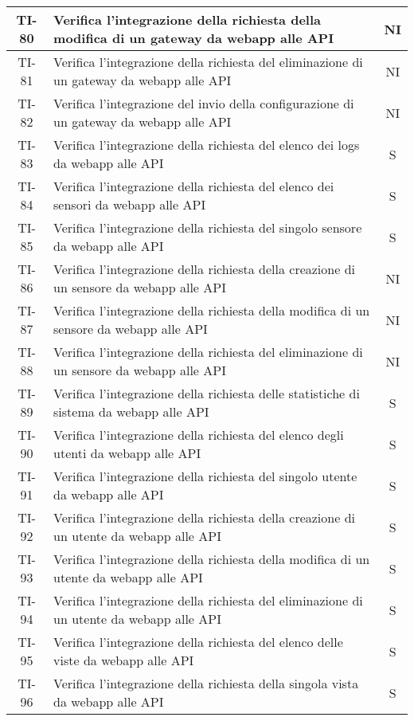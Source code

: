 \begin{center}
\begin{longtable}{|c|p{12cm}|c|}
			\hline
			TI-80 & Verifica l'integrazione della richiesta della modifica di un gateway da webapp alle API & NI \\
			\hline
			TI-81 & Verifica l'integrazione della richiesta del eliminazione di un gateway da webapp alle API & NI \\
			\hline
			TI-82 & Verifica l'integrazione del invio della configurazione di un gateway da webapp alle API & NI \\
			\hline
			TI-83 & Verifica l'integrazione della richiesta del elenco dei logs da webapp alle API & S \\
			\hline
			TI-84 & Verifica l'integrazione della richiesta del elenco dei sensori da webapp alle API & S \\
			\hline
			TI-85 & Verifica l'integrazione della richiesta del singolo sensore da webapp alle API & S \\
			\hline
			TI-86 & Verifica l'integrazione della richiesta della creazione di un sensore da webapp alle API & NI \\
			\hline
			TI-87 & Verifica l'integrazione della richiesta della modifica di un sensore da webapp alle API & NI \\
			\hline
			TI-88 & Verifica l'integrazione della richiesta del eliminazione di un sensore da webapp alle API & NI \\
			\hline
			TI-89 & Verifica l'integrazione della richiesta delle statistiche di sistema da webapp alle API & S \\
			\hline
			TI-90 & Verifica l'integrazione della richiesta del elenco degli utenti da webapp alle API & S \\
			\hline
			TI-91 & Verifica l'integrazione della richiesta del singolo utente da webapp alle API & S \\
			\hline
			TI-92 & Verifica l'integrazione della richiesta della creazione di un utente da webapp alle API & S \\
			\hline
			TI-93 & Verifica l'integrazione della richiesta della modifica di un utente da webapp alle API & S \\
			\hline
			TI-94 & Verifica l'integrazione della richiesta del eliminazione di un utente da webapp alle API & S \\
			\hline
			TI-95 & Verifica l'integrazione della richiesta del elenco delle viste da webapp alle API & S \\
			\hline
			TI-96 & Verifica l'integrazione della richiesta della singola vista da webapp alle API & S \\

\end{longtable}
\end{center}
